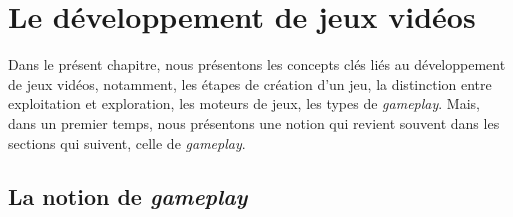 \chapter{Le développement de jeux vidéos}

\label{chap.dev_jv}
Dans le pr\'esent chapitre, nous pr\'esentons les concepts cl\'es
li\'es au d\'eveloppement de jeux vid\'eos, notamment, les \'etapes de
cr\'eation d'un jeu, la distinction entre exploitation et exploration,
les moteurs de jeux, les types de \emph{gameplay}.
%
Mais, dans un premier temps, nous pr\'esentons une notion qui revient
souvent dans les sections qui suivent, celle de \emph{gameplay}.



\section{La notion de \emph{gameplay}}

